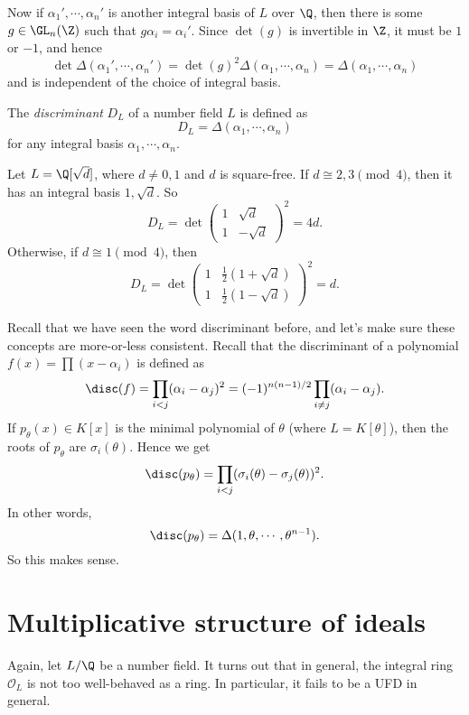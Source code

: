 \documentclass[a4paper]{article}
\begin{document}
Now if $\alpha_1', \cdots, \alpha_n'$ is another integral basis of $L$ over $\Q$, then there is some $g \in \GL_n(\Z)$ such that $g\alpha_i = \alpha_i'$. Since $\det (g)$ is invertible in $\Z$, it must be $1$ or $-1$, and hence
\[
  \det \Delta(\alpha_1', \cdots, \alpha_n') = \det(g)^2 \Delta (\alpha_1, \cdots, \alpha_n) = \Delta(\alpha_1, \cdots, \alpha_n)
\]
and is independent of the choice of integral basis.
\begin{defi}[Discriminant]
  The \emph{discriminant} $D_L$ of a number field $L$ is defined as
  \[
    D_L = \Delta(\alpha_1, \cdots, \alpha_n)
  \]
  for any integral basis $\alpha_1, \cdots, \alpha_n$.
\end{defi}

\begin{eg}
  Let $L = \Q[\sqrt{d}]$, where $d \not= 0, 1$ and $d$ is square-free. If $d \cong 2, 3 \pmod 4$, then it has an integral basis $1, \sqrt{d}$. So
  \[
    D_L = \det
    \begin{pmatrix}
      1 & \sqrt{d}\\
      1 & -\sqrt{d}
    \end{pmatrix}^2 = 4d.
  \]
  Otherwise, if $d \cong 1 \pmod 4$, then
  \[
    D_L = \det
    \begin{pmatrix}
      1 & \frac{1}{2}(1 + \sqrt{d})\\
      1 & \frac{1}{2}(1 - \sqrt{d})
    \end{pmatrix}^2 = d.
  \]
\end{eg}

Recall that we have seen the word discriminant before, and let's make sure these concepts are more-or-less consistent. Recall that the discriminant of a polynomial $f(x) = \prod (x - \alpha_i)$ is defined as
\[
  \disc(f) = \prod_{i < j} (\alpha_i - \alpha_j)^2 = (-1)^{n(n - 1)/2}\prod_{i \not= j}(\alpha_i - \alpha_j).
\]
If $p_\theta(x) \in K[x]$ is the minimal polynomial of $\theta$ (where $L = K[\theta]$), then the roots of $p_\theta$ are $\sigma_i(\theta)$. Hence we get
\[
  \disc(p_\theta) = \prod_{i < j}(\sigma_i(\theta) - \sigma_j(\theta))^2.
\]
In other words,
\[
  \disc(p_\theta) = \Delta(1, \theta, \cdots, \theta^{n - 1}).
\]
So this makes sense.


\section{Multiplicative structure of ideals}
Again, let $L/\Q$ be a number field. It turns out that in general, the integral ring $\mathcal{O}_L$ is not too well-behaved as a ring. In particular, it fails to be a UFD in general.
\end{document}
